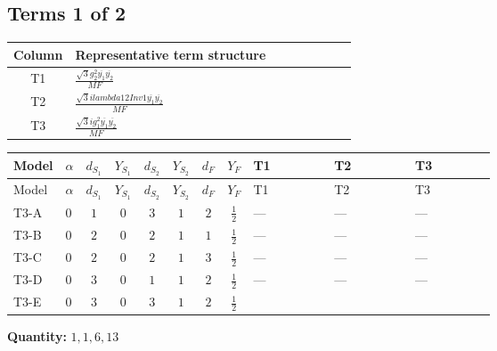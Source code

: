 \documentclass[8pt]{article}
\begin{document}
\begin{landscape}
\subsection*{Terms 1 of 2}
\begin{center}
\begin{tabular}{@{}c >{\raggedright\arraybackslash}p{0.82\linewidth}@{}}
\toprule
Column & Representative term structure \\
\midrule
T1 & \(\displaystyle \frac{\sqrt{3} g_{2}^{2} \overline{y_{1}} \overline{y_{2}}}{MF}\) \\
\midrule
T2 & \(\displaystyle \frac{\sqrt{3} i lambda12Inv1 \overline{y_{1}} \overline{y_{2}}}{MF}\) \\
\midrule
T3 & \(\displaystyle \frac{\sqrt{3} i g_{1}^{2} \overline{y_{1}} \overline{y_{2}}}{MF}\) \\
\midrule
\bottomrule
\end{tabular}
\end{center}
\smallskip
\tiny
\begin{longtable}{@{}llcccccc >{\raggedright\arraybackslash}p{0.21\linewidth} >{\raggedright\arraybackslash}p{0.21\linewidth} >{\raggedright\arraybackslash}p{0.21\linewidth}@{}}
\toprule
Model & $\alpha$ & $d_{S_1}$ & $Y_{S_1}$ & $d_{S_2}$ & $Y_{S_2}$ & $d_F$ & $Y_F$ & T1 & T2 & T3 \\
\midrule
\endfirsthead
\toprule
Model & $\alpha$ & $d_{S_1}$ & $Y_{S_1}$ & $d_{S_2}$ & $Y_{S_2}$ & $d_F$ & $Y_F$ & T1 & T2 & T3 \\
\midrule
\endhead
T3-A & $0$ & $1$ & $0$ & $3$ & $1$ & $2$ & $\frac{1}{2}$ & --- & --- & --- \\
\midrule
T3-B & $0$ & $2$ & $0$ & $2$ & $1$ & $1$ & $\frac{1}{2}$ & --- & --- & --- \\
\midrule
T3-C & $0$ & $2$ & $0$ & $2$ & $1$ & $3$ & $\frac{1}{2}$ & --- & --- & --- \\
\midrule
T3-D & $0$ & $3$ & $0$ & $1$ & $1$ & $2$ & $\frac{1}{2}$ & --- & --- & --- \\
\midrule
T3-E & $0$ & $3$ & $0$ & $3$ & $1$ & $2$ & $\frac{1}{2}$ & \scriptsize\adjustbox{max width=\linewidth}{$\begin{gathered} - \frac{\sqrt{3} g_{2}^{2} \overline{y_{1}} \overline{y_{2}}}{6 MF}\end{gathered}$} & \scriptsize\adjustbox{max width=\linewidth}{$\begin{gathered} - \frac{\sqrt{3} i lambda12Inv1 \overline{y_{1}} \overline{y_{2}}}{6 MF}\end{gathered}$} & \scriptsize\adjustbox{max width=\linewidth}{$\begin{gathered} \frac{\sqrt{3} i g_{1}^{2} \overline{y_{1}} \overline{y_{2}}}{8 MF}\end{gathered}$} \\
\midrule
\bottomrule
\end{longtable}
\clearpage
\noindent\textbf{Quantity: }$\mathrm{1,1,6,13}$\par\smallskip

\end{landscape}
\end{document}
